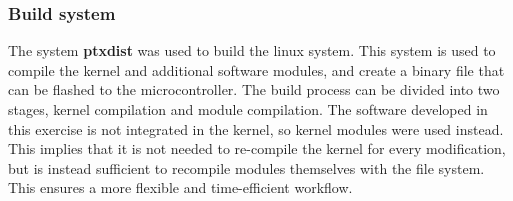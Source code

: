 \subsubsection{Build system}
The system {\bf ptxdist} was used to build the linux system. This system is used to compile the kernel and additional software modules, and create a binary file that can be flashed to the microcontroller. The build process can be divided into two stages, kernel compilation and module compilation. The software developed in this exercise is not integrated in the kernel, so kernel modules were used instead. This implies that it is not needed to re-compile the kernel for every modification, but is instead sufficient to recompile modules themselves with the file system. This ensures a more flexible and time-efficient workflow.